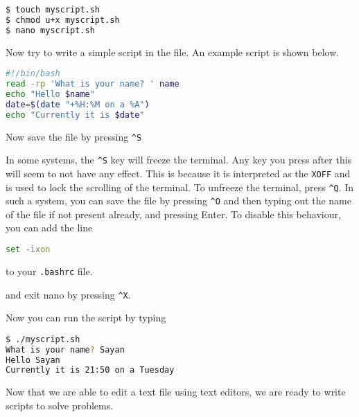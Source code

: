 \begin{lstlisting}[language=bash]
$ touch myscript.sh
$ chmod u+x myscript.sh
$ nano myscript.sh
\end{lstlisting}

Now try to write a simple script in the file.
An example script is shown below.

\begin{lstlisting}[language=bash]
#!/bin/bash
read -rp 'What is your name? ' name
echo "Hello $name"
date=$(date "+%H:%M on a %A")
echo "Currently it is $date"
\end{lstlisting}


Now save the file by pressing \lstinline|^S|
\begin{remark}
  In some systems, the \lstinline|^S| key
  will freeze the terminal. Any key you press after this
  will seem to not have any effect.
  This is because it is interpreted as the \lstinline|XOFF|
  and is used to lock the scrolling of the terminal.
  To unfreeze the terminal, press \lstinline|^Q|.
  In such a system, you can save the file by pressing
  \lstinline|^O| and then typing out the
  name of the file if not present already, and pressing
  Enter.
  To disable this behaviour, you can add the line
  \begin{lstlisting}[language=bash]
  set -ixon \end{lstlisting}
  to your \lstinline|.bashrc| file.
\end{remark}
and exit nano by pressing \lstinline|^X|.

Now you can run the script by typing

\begin{lstlisting}[language=bash]
$ ./myscript.sh
What is your name? Sayan
Hello Sayan
Currently it is 21:50 on a Tuesday
\end{lstlisting}

Now that we are able to edit a text file using text editors,
we are ready to write scripts to solve problems.
